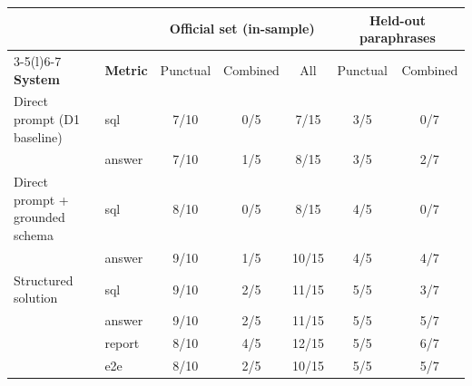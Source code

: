 \begin{tabular}{@{}llccccc@{}}
\toprule
& & \multicolumn{3}{c}{\textbf{Official set (in-sample)}} & \multicolumn{2}{c}{\textbf{Held-out paraphrases}} \\
\cmidrule(lr){3-5}\cmidrule(l){6-7}
\textbf{System} & \textbf{Metric} & Punctual & Combined & All & Punctual & Combined \\
\midrule
Direct prompt (D1 baseline) & sql & 7/10 & 0/5 & 7/15 & 3/5 & 0/7 \\
 & answer & 7/10 & 1/5 & 8/15 & 3/5 & 2/7 \\
\addlinespace
Direct prompt + grounded schema & sql & 8/10 & 0/5 & 8/15 & 4/5 & 0/7 \\
 & answer & 9/10 & 1/5 & 10/15 & 4/5 & 4/7 \\
\addlinespace
Structured solution & sql & 9/10 & 2/5 & 11/15 & 5/5 & 3/7 \\
 & answer & 9/10 & 2/5 & 11/15 & 5/5 & 5/7 \\
 & report & 8/10 & 4/5 & 12/15 & 5/5 & 6/7 \\
 & e2e & 8/10 & 2/5 & 10/15 & 5/5 & 5/7 \\
\bottomrule
\end{tabular}
